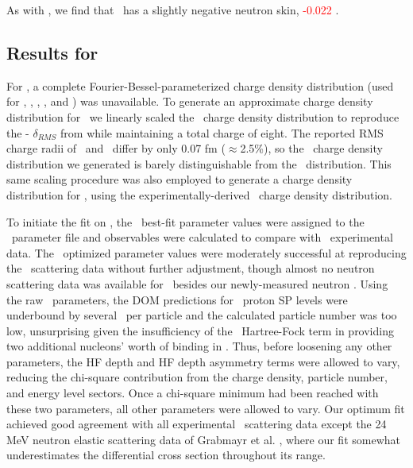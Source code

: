 As with \caForty, we find that \oSix\ has a slightly negative neutron skin,
\textcolor{red}{-0.022} \femto\meter.

\subsection{Results for \oEight}
For \oEight, a complete Fourier-Bessel-parameterized charge density distribution (used
for \oSix, \caAughtEight, \niEightFour, \snTwelve, and \pbEight) was unavailable. To
generate an approximate charge density distribution for \oEight\, we linearly
scaled the \oSix\ charge density distribution to reproduce the \oEight-\oSix
$\delta_{RMS}$ from \cite{DeVries1987} while maintaining a total charge of eight.
The reported RMS charge radii of \oSix\ and \oEight\ differ by only
0.07 fm ($\approx$2.5\%), so the \oEight\ charge density distribution
we generated is barely distinguishable from the \oSix\ distribution.
This same scaling procedure was also employed to
generate a charge density distribution for \snTwelve, using the
experimentally-derived \snFour\ charge density distribution.

To initiate the fit on \oEight, the \oSix\ best-fit parameter values
were assigned to the \oEight\ parameter file and observables were calculated to compare
with \oEight\ experimental data. The \oSix\ optimized parameter values
were moderately successful at reproducing
the \oEight\ scattering data without further adjustment, though almost no
neutron scattering data was
available for \oEight\ besides our newly-measured neutron \tot.
Using the raw \oSix\ parameters, the DOM predictions for
\oEight\ proton SP levels were underbound by several \mega\electronvolt\ per
particle and the calculated particle number was too low, unsurprising
given the insufficiency of the \oSix\ Hartree-Fock term in providing
two additional nucleons' worth of binding in \oEight. Thus, before
loosening any other parameters, the HF depth and HF depth asymmetry terms were allowed to vary,
reducing the chi-square contribution from the charge density, particle number, and energy level
sectors. Once a chi-square minimum had been reached with these two parameters, all other 
parameters were allowed to vary. Our optimum fit achieved good agreement with all
experimental \oEight\ scattering data except the 24 MeV neutron elastic scattering data
of Grabmayr et al. \cite{Grabmayr1980}, where our fit somewhat underestimates
the differential cross section throughout its range.

